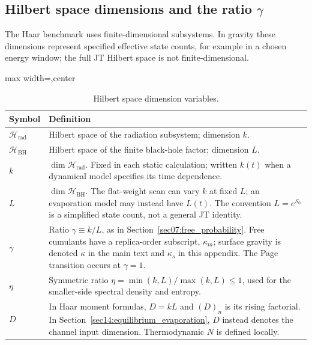 \documentclass[11pt,letterpaper]{article}
\theoremstyle{plain}
\theoremstyle{definition}
\theoremstyle{remark}
\begin{document}
\subsection{Hilbert space dimensions and the ratio \texorpdfstring{$\gamma$}{gamma}}

The Haar benchmark uses finite-dimensional subsystems.  In gravity these
dimensions represent specified effective state counts, for example in a chosen
energy window; the full JT Hilbert space is not finite-dimensional.

\begin{table}[ht]
\centering
\renewcommand{\arraystretch}{1.35}
\begin{adjustbox}{max width=\textwidth,center}
\begin{tabular}{@{}lp{10.6cm}@{}}
\hline
\textbf{Symbol} & \textbf{Definition} \\
\hline
$\mathcal{H}_{\mathrm{rad}}$ &
  Hilbert space of the radiation subsystem; dimension $k$. \\
$\mathcal{H}_{\mathrm{BH}}$ &
  Hilbert space of the finite black-hole factor; dimension $L$. \\
$k$ &
  $\dim\mathcal{H}_{\mathrm{rad}}$.  Fixed in each static calculation;
  written $k(t)$ when a dynamical model specifies its time dependence. \\
$L$ &
  $\dim\mathcal{H}_{\mathrm{BH}}$.  The flat-weight scan can vary $k$ at
  fixed $L$; an evaporation model may instead have $L(t)$.
  The convention $L=e^{S_0}$ is a simplified state count, not a general JT identity. \\
$\gamma$ &
  Ratio $\gamma \equiv k/L$, as in Section~\ref{sec07:free_probability}.
  Free cumulants have a replica-order subscript, $\kappa_m$; surface gravity
  is denoted $\kappa$ in the main text and $\kappa_s$ in this appendix.
  The Page transition occurs at $\gamma = 1$. \\
$\eta$ &
  Symmetric ratio $\eta=\min(k,L)/\max(k,L)\leq1$, used for the smaller-side
  spectral density and entropy. \\
$D$ &
  In Haar moment formulas, $D=kL$ and $(D)_n$ is its rising factorial.
  In Section~\ref{sec14:equilibrium_evaporation}, $D$ instead denotes the
  channel input dimension. Thermodynamic $N$ is defined locally. \\
\hline
\end{tabular}
\end{adjustbox}
\caption{Hilbert space dimension variables.}
\label{tab16:hilbert_variables}
\end{table}
\end{document}
